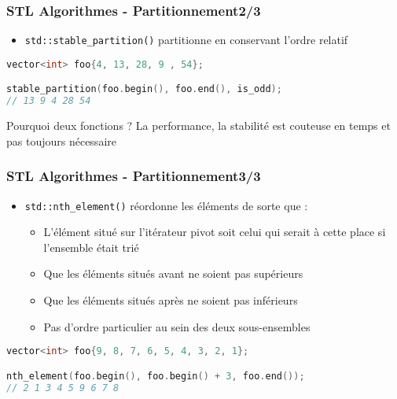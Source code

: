 \documentclass[C++.tex]{subfiles}
\begin{document}
\begin{frame}[fragile]
	\frametitle{STL Algorithmes - Partitionnement\titlehfill{}2/3}
	\begin{itemize}
		\item \lstinline|std::stable_partition()| partitionne en conservant l'ordre relatif
	\end{itemize}

	\begin{lstlisting}[language=C++]
vector<int> foo{4, 13, 28, 9 , 54};

stable_partition(foo.begin(), foo.end(), is_odd);
// 13 9 4 28 54\end{lstlisting}

	\pause

	\begin{block}{Pourquoi deux fonctions ?}
		La performance, la stabilité est couteuse en temps et pas toujours nécessaire
	\end{block}
\end{frame}

\begin{frame}[fragile]
	\frametitle{STL Algorithmes - Partitionnement\titlehfill{}3/3}
	\begin{itemize}
		\item \lstinline|std::nth_element()| réordonne les éléments de sorte que :
		\begin{itemize}
			\item L'élément situé sur l'itérateur pivot soit celui qui serait à cette place si l'ensemble était trié
			\item Que les éléments situés avant ne soient pas supérieurs
			\item Que les éléments situés après ne soient pas inférieurs
			\item Pas d'ordre particulier au sein des deux sous-ensembles
		\end{itemize}
	\end{itemize}


	\begin{lstlisting}[language=C++]
vector<int> foo{9, 8, 7, 6, 5, 4, 3, 2, 1};

nth_element(foo.begin(), foo.begin() + 3, foo.end());
// 2 1 3 4 5 9 6 7 8\end{lstlisting}
\end{frame}
\end{document}
